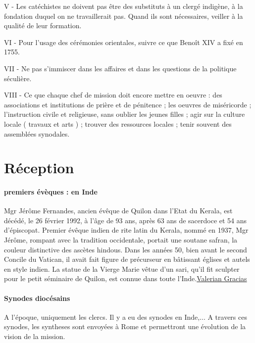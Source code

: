 V - Les catéchistes ne doivent pas être des substituts à un clergé indigène, à
la fondation duquel on ne travaillerait pas. Quand ils sont nécessaires, veiller
à la qualité de leur formation.

VI - Pour l'usage des cérémonies orientales, suivre ce que Benoît XIV a fixé
en 1755.

VII - Ne pas s'immiscer dans les affaires et dans les questions de la politique
séculière.

VIII - Ce que chaque chef de mission doit encore mettre en oeuvre : des associations
et institutions de prière et de pénitence ; les oeuvres de miséricorde ;
l'instruction civile et religieuse, sans oublier les jeunes filles ; agir sur la culture
locale ( travaux et arts ) ; trouver des ressources locales ; tenir souvent des assemblées
synodales.

\section{Réception}

\paragraph{premiers évèques : en Inde} Mgr Jérôme Fernandes, ancien évêque de Quilon dans l’Etat du Kerala, est décédé, le 26 février 1992, à l’âge de 93 ans, après 63 ans de sacerdoce et 54 ans d’épiscopat. Premier évêque indien de rite latin du Kerala, nommé en 1937, Mgr Jérôme, rompant avec la tradition occidentale, portait une soutane safran, la couleur distinctive des ascètes hindous. Dans les années 50, bien avant le second Concile du Vatican, il avait fait figure de précurseur en bâtissant églises et autels en style indien. La statue de la Vierge Marie vêtue d’un sari, qu’il fit sculpter pour le petit séminaire de Quilon, est connue dans toute l’Inde.\href{https://fr.wikipedia.org/wiki/Valerian_Gracias}{Valerian Gracias }

\paragraph{Synodes diocésains} A l'époque, uniquement les clercs. Il y a eu des synodes en Inde,...
A travers ces synodes, les syntheses sont envoyées à Rome et permettront une évolution de la vision de la mission. 


